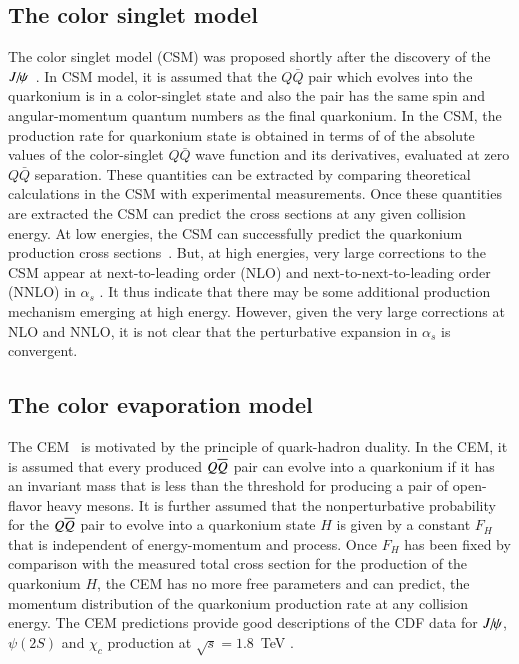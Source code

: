 \subsection{The color singlet model}


The color singlet model (CSM) was proposed shortly after the discovery of the 
$J\hspace{-.08em}/\hspace{-.14em}\psi$~\cite{Einhorn:1975ua,Berger:1980ni,Ellis:1976fj,Carlson:1976cd}.
In CSM model, it is assumed that the $Q\bar Q$ pair which evolves into
the quarkonium is in a color-singlet state and also the pair has the same spin
and angular-momentum quantum numbers as the final quarkonium.
In the CSM, the production rate for quarkonium state is obtained in terms of 
of the absolute values of the color-singlet $Q\bar Q$ wave function and its
derivatives, evaluated at zero $Q\bar Q$ separation.
These quantities can be extracted by comparing theoretical 
calculations in the CSM with experimental measurements. Once these quantities 
are extracted the CSM  can predict the cross sections at any given collision energy.
At low energies, the CSM can successfully  predict the quarkonium
production cross sections~\cite{Schuler:1994hy}.
But, at high energies, very large corrections to the CSM appear at next-to-leading
order (NLO) and next-to-next-to-leading order (NNLO) in $\alpha_s$
\cite{Artoisenet:2007xi,Campbell:2007ws,Artoisenet:2008fc}.
It thus indicate that there may be some additional production mechanism emerging at
high energy. However, given the very large corrections at
NLO and NNLO, it is not clear that the perturbative expansion in
$\alpha_s$ is convergent. 

\subsection{The color evaporation model}  
\label{prod_sec:CEM}

The CEM~\cite{Fritzsch:1977ay,Amundson:1995em,Amundson:1996qr}
is motivated by the principle of quark-hadron duality. In the CEM, it
is assumed that every produced $Q \overline{Q}$ pair can evolve into a quarkonium
if it has an invariant mass that is less than the threshold for
producing a pair of open-flavor heavy mesons. It is further assumed that
the nonperturbative probability for the $Q \overline{Q}$ pair to evolve into a
quarkonium state $H$ is given by a constant $F_H$ that is independent of 
energy-momentum and process. Once $F_H$ has been fixed by
comparison with the measured total cross section for the production of
the quarkonium $H$, the CEM has no more free parameters and
can predict, the momentum distribution of the quarkonium production rate
at any collision energy.
The CEM predictions provide good descriptions of the CDF data for $J\hspace{-.08em}/\hspace{-.14em}\psi$,
$\psi(2S)$ and $\chi_{c}$ production at $\sqrt{s}=1.8$~TeV
\cite{Amundson:1996qr}. 


